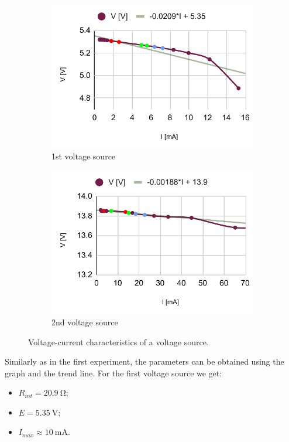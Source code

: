 \begin{figure}[H]
	\centering
	\begin{subfigure}{.5\textwidth}
		\centering
		\includegraphics[width=.99\linewidth]{schematics/chart3.pdf}
		\caption{1st voltage source}
	\end{subfigure}%
	\begin{subfigure}{.5\textwidth}
		\centering
		\includegraphics[width=.99\linewidth]{schematics/chart4.pdf}
		\caption{2nd voltage source}
	\end{subfigure}
	\caption{Voltage-current characteristics of a voltage source.}
	\label{fig:2}
\end{figure}

Similarly as in the first experiment, the parameters can be obtained using the graph and the trend line. For the first voltage source we get:
\begin{itemize}
	\item $R_{int} = \SI{20.9}{\ohm}$;
	\item $E=\SI{5.35}{\volt}$;
	\item $I_{max}\approx \SI{10}{\milli\ampere}$.
\end{itemize}

